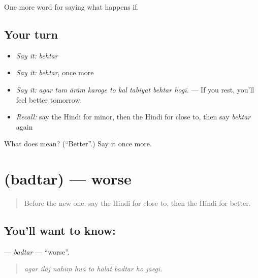 \begin{grammarlens}[title={What you've built}]
One more word for saying what happens if.
\end{grammarlens}

\subsection*{Your turn}
\begin{itemize}
\raggedright
  \item \emph{Say it:} \emph{behtar}
  \item \emph{Say it:} \emph{behtar}, once more
  \item \emph{Say it:} \emph{agar tum ārām karoge to kal tabīyat behtar hogī.} — If you rest, you'll feel better tomorrow.
  \item \emph{Recall:} say the Hindi for minor, then the Hindi for close to, then say \emph{behtar} again
\end{itemize}

\begin{tcolorbox}[breakable,colback=teal!4,colframe=teal!35!black,title={Before you move on}]
What does  mean? (\textquotedblleft{}Better\textquotedblright{}.) Say it once more.
\end{tcolorbox}
\section[\texorpdfstring{\hi{बदतर} (badtar)}{बदतर (badtar)}]{ (badtar) — worse}

\label{lesson:HI-C389-badtar}



\begin{quote}
Before the new one: say the Hindi for close to, then the Hindi for better.
\end{quote}

\subsection*{You'll want to know: }
\textbf{} — \emph{badtar} — \textquotedblleft{}worse\textquotedblright{}.

\begin{quote}
        
\end{quote}

\begin{quote}
\emph{agar ilāj nahīṃ huā to hālat badtar ho jāegī.}
\end{quote}

